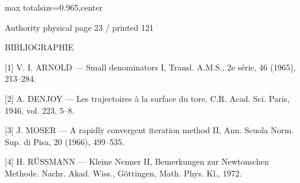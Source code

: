 \documentclass{article}
\begin{document}
\newpage
\noindent\begin{adjustbox}{max totalsize={\textwidth}{0.965\textheight},center}\begin{minipage}{\textwidth}
\noindent\hfill\scriptsize Authority physical page 23 / printed 121\par\normalsize
BIBLIOGRAPHIE

[1] V. I. ARNOLD — Small denominators I, Transl. A.M.S., 2e série, 46 (1965), 213–284.

[2] A. DENJOY — Les trajectoires à la surface du tore, C.R. Acad. Sci. Paris, 1946, vol. 223, 5–8.

[3] J. MOSER — A rapidly convergent iteration method II, Ann. Scuola Norm. Sup. di Pisa, 20 (1966), 499–535.

[4] H. RÜSSMANN — Kleine Nenner II, Bemerkungen zur Newtonschen Methode. Nachr. Akad. Wiss., Göttingen, Math. Phys. Kl., 1972.
\end{minipage}\end{adjustbox}
\end{document}

